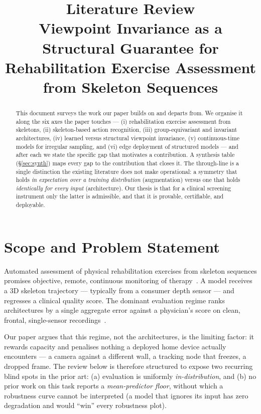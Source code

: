\documentclass[11pt]{article}
\title{\textbf{Literature Review}\\[4pt]
\large Viewpoint Invariance as a Structural Guarantee for\\
Rehabilitation Exercise Assessment from Skeleton Sequences}
\author{}
\date{}
\begin{document}
\maketitle

\begin{abstract}
\noindent This document surveys the work our paper builds on and departs from. We
organise it along the six axes the paper touches --- (i) rehabilitation exercise
assessment from skeletons, (ii) skeleton-based action recognition, (iii)
group-equivariant and invariant architectures, (iv) learned versus structural
viewpoint invariance, (v) continuous-time models for irregular sampling, and
(vi) edge deployment of structured models --- and after each we state the
specific gap that motivates a contribution. A synthesis table (\S\ref{sec:synth})
maps every gap to the contribution that closes it. The through-line is a single
distinction the existing literature does not make operational: a symmetry that
holds \emph{in expectation over a training distribution} (augmentation) versus one
that holds \emph{identically for every input} (architecture). Our thesis is that
for a clinical screening instrument only the latter is admissible, and that it is
provable, certifiable, and deployable.
\end{abstract}

\section{Scope and Problem Statement}
\label{sec:scope}

Automated assessment of physical rehabilitation exercises from skeleton sequences
promises objective, remote, continuous monitoring of therapy~\cite{capecci2019kimore}.
A model receives a $3$D skeleton trajectory --- typically from a consumer depth
sensor --- and regresses a clinical quality score. The dominant evaluation regime
ranks architectures by a single aggregate error against a physician's score on
clean, frontal, single-sensor recordings~\cite{karlov2024,abedi2023,kuang2026,pct2026}.

Our paper argues that this regime, not the architectures, is the limiting factor:
it rewards capacity and penalises nothing a deployed home device actually
encounters --- a camera against a different wall, a tracking node that freezes, a
dropped frame. The review below is therefore structured to expose two recurring
blind spots in the prior art: (a) evaluation is uniformly \emph{in-distribution},
and (b) no prior work on this task reports a \emph{mean-predictor floor}, without
which a robustness curve cannot be interpreted (a model that ignores its input has
zero degradation and would ``win'' every robustness plot).
\end{document}
